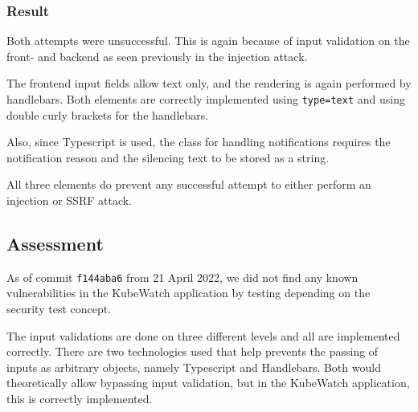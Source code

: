 \subsubsection{Result}
Both attempts were unsuccessful. This is again because of input validation on the front- and backend as seen previously in the injection attack.

The frontend input fields allow text only, and the rendering is again performed by handlebars. Both elements are correctly implemented using \lstinline "type=text" and using double curly brackets for the handlebars.

Also, since Typescript is used, the class for handling notifications requires the notification reason and the silencing text to be stored as a string.

All three elements do prevent any successful attempt to either perform an injection or SSRF attack.


\subsection{Assessment}
As of commit \lstinline "f144aba6" from 21 April 2022, we did not find any known vulnerabilities in the KubeWatch application by testing depending on the security test concept.

The input validations are done on three different levels and all are implemented correctly. There are two technologies used that help prevents the passing of inputs as arbitrary objects, namely Typescript and Handlebars. Both would theoretically allow bypassing input validation, but in the KubeWatch application, this is correctly implemented.

